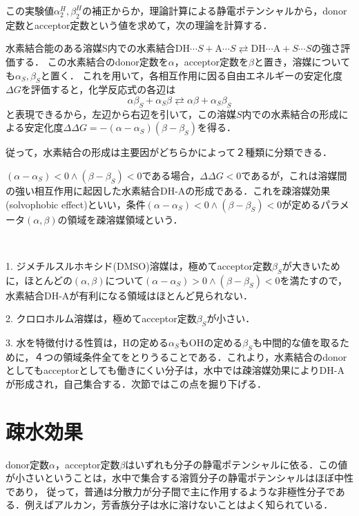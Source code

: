 \documentclass[uplatex, dvipdfmx]{jsreport}
\begin{document}
この実験値$\alpha_2^H,\beta_2^H$の補正からか，理論計算による静電ポテンシャルから，donor定数とacceptor定数という値を求めて，次の理論を計算する．
\begin{theory}
    水素結合能のある溶媒S内での水素結合$\mathrm{DH}\cdots S+\mathrm{A}\cdots S\rightleftarrows\mathrm{DH\cdots A}+S\cdots S$の強さ評価する．
    この水素結合のdonor定数を$\alpha$，acceptor定数を$\beta$と置き，溶媒についても$\alpha_S,\beta_S$と置く．
    これを用いて，各相互作用に因る自由エネルギーの安定化度$\Delta G$を評価すると，化学反応式の各辺は
    \[ \alpha\beta_S+\alpha_S\beta \rightleftarrows \alpha\beta + \alpha_S\beta_S \]
    と表現できるから，左辺から右辺を引いて，この溶媒$S$内での水素結合の形成による安定化度$\Delta\Delta G=-(\alpha-\alpha_S)(\beta-\beta_S)$を得る．

    従って，水素結合の形成は主要因がどちらかによって２種類に分類できる．
\end{theory}
\begin{definition}
    $(\alpha-\alpha_S)<0\land (\beta-\beta_S)<0$である場合，$\Delta\Delta G<0$であるが，これは溶媒間の強い相互作用に起因した水素結合DH-Aの形成である．これを疎溶媒効果(solvophobic effect)といい，条件$(\alpha-\alpha_S)<0\land (\beta-\beta_S)<0$が定めるパラメータ$(\alpha,\beta)$の領域を疎溶媒領域という．
\end{definition}
\begin{example}　

    1. ジメチルスルホキシド(DMSO)溶媒は，極めてacceptor定数$\beta_S$が大きいために，ほとんどの$(\alpha,\beta)$について$(\alpha-\alpha_S)>0\land (\beta-\beta_S)<0$を満たすので，水素結合DH-Aが有利になる領域はほとんど見られない．

    2. クロロホルム溶媒は，極めてacceptor定数$\beta_S$が小さい．

    3. 水を特徴付ける性質は，Hの定める$\alpha_S$もOHの定める$\beta_S$も中間的な値を取るために，４つの領域条件全てをとりうることである．これより，水素結合のdonorとしてもacceptorとしても働きにくい分子は，水中では疎溶媒効果によりDH-Aが形成され，自己集合する．次節ではこの点を掘り下げる．
\end{example}

\section{疎水効果}

donor定数$\alpha$，acceptor定数$\beta$はいずれも分子の静電ポテンシャルに依る．この値が小さいということは，水中で集合する溶質分子の静電ポテンシャルはほぼ中性であり，
従って，普通は分散力が分子間で主に作用するような非極性分子である．例えばアルカン，芳香族分子は水に溶けないことはよく知られている．
\end{document}
